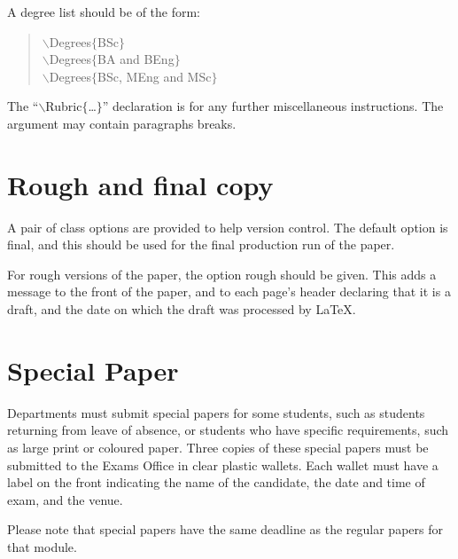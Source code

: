 \documentclass[fontsize=12, final]{UoYOpenExam}
\newcommand{\kwd}[1]{\textsf{#1}}
\newcommand{\cmd}[1]{$\backslash$\textsf{#1}}
\newcommand{\tcmd}[3]{\cmd{#1}$\{$#3{#2}$\}$}
\newcommand{\pcmd}[2]{\tcmd{#1}{#2}{\kwd}}
\begin{document}
A degree list should be of the form:
\begin{verse}
        \pcmd{Degrees}{BSc}\\
        \pcmd{Degrees}{BA and BEng}\\
        \pcmd{Degrees}{BSc, MEng and MSc}
\end{verse}

The ``\pcmd{Rubric}{\ldots}'' declaration is for any further
miscellaneous instructions.  The argument may contain paragraphs
breaks.

\section{Rough and final copy}
A pair of class options are provided to help version control.  The
default option is \kwd{final}, and this should be used for the final
production run of the paper.

For rough versions of the paper, the option \kwd{rough} should be
given.  This adds a message to the front of the paper, and to each
page's header declaring that it is a draft, and the date on which the
draft was processed by \LaTeX.

\section{Special Paper}
Departments must submit special papers for some students, such as students returning from leave of absence, or students who have specific requirements, such as large print or coloured paper. Three copies of these special papers must be submitted to the Exams Office in clear plastic wallets. Each wallet must have a label on the front indicating the name of the candidate, the date and time of exam, and the venue.

Please note that special papers have the same deadline as the regular papers for that module.

%


\end{document}

